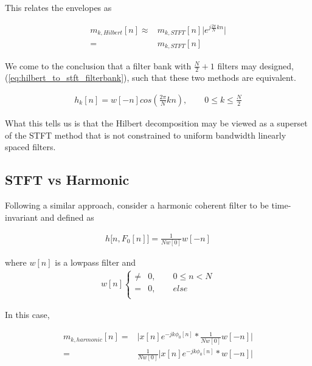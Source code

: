 \documentclass [11pt, proquest,oneside] {ganter_thesis}[2015/03/03]
\begin{document}
This relates the envelopes as 

\begin{align}
m_{k,Hilbert}[n] \approx& m_{k,STFT}[n] \Big| e^{j\frac{2\pi}{N}kn} \Big| \nonumber \\
=& m_{k,STFT}[n]
\end{align}

We come to the conclusion that a filter bank with $\frac{N}{2} + 1$ filters may designed, (\ref{eq:hilbert_to_stft_filterbank}), such that these two methods are equivalent.

\begin{align}
\label{eq:hilbert_to_stft_filterbank}
h_k[n] = w[-n]cos(\frac{2\pi}{N}kn), \qquad 0 \leq k \leq \frac{N}{2}
\end{align}

What this tells us is that the Hilbert decomposition may be viewed as a superset of the STFT method that is not constrained to uniform bandwidth linearly spaced filters.

\subsection{STFT vs Harmonic}\label{ss:stft_vs_harmonic}

Following a similar approach, consider a harmonic coherent filter to be time-invariant and defined as

\begin{align}
h\big[n, F_0[n] \big] = \frac{1}{Nw[0]} w[-n]
\end{align}

where $w[n]$ is a lowpass filter and 
\begin{align}
w[n] \left\{
                \begin{array}{ll}
                \neq& 0, \qquad 0 \leq n < N \nonumber \\
			   =& 0, \qquad else \\
                \end{array}
              \right.
\end{align}

In this case,

\begin{align}
m_{k,harmonic}[n] =& \Big| x[n] e^{-jk\phi_0 [n]} *  \frac{1}{Nw[0]} w[-n] \Big|  \nonumber \\
\label{eq:m_k_harmonic_with_stft_filter}
=& \frac{1}{Nw[0]} \Big| x[n] e^{-jk\phi_0 [n]} *  w[-n] \Big|
\end{align}
\end{document}
